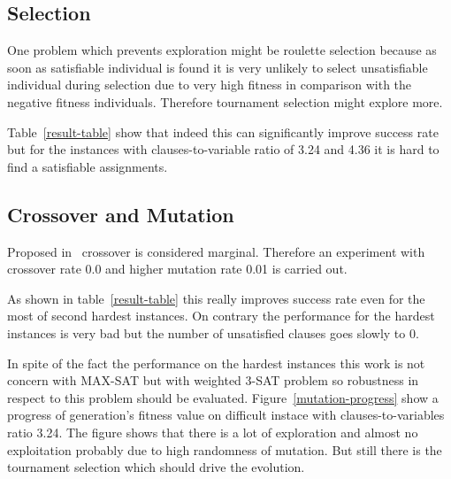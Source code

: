 \documentclass{article}
\begin{document}
\subsection{Selection}

One problem which prevents exploration might be roulette selection
because as soon as satisfiable individual is found
it is very unlikely to select unsatisfiable individual during selection
due to very high fitness in comparison with the negative fitness individuals.
Therefore tournament selection might explore more.

Table~\ref{result-table} show that indeed this can significantly improve
success rate but for the instances with clauses-to-variable ratio of 3.24
and 4.36 it is hard to find a satisfiable assignments.

\subsection{Crossover and Mutation}

Proposed in~\cite{park1995} crossover is considered marginal.
Therefore an experiment with crossover rate 0.0 and higher mutation rate 0.01
is carried out.

As shown in table~\ref{result-table} this really improves success rate even
for the most of second hardest instances.
On contrary the performance for the hardest instances is very bad but the
number of unsatisfied clauses goes slowly to 0.

In spite of the fact the performance on the hardest instances
this work is not concern with MAX-SAT but with weighted 3-SAT problem
so robustness in respect to this problem should be evaluated.
Figure~\ref{mutation-progress} show a progress of generation's fitness value
on difficult instace with clauses-to-variables ratio 3.24.
The figure shows that there is a lot of exploration
and almost no exploitation probably due to high randomness of mutation.
But still there is the tournament selection which should drive the evolution.
\end{document}
